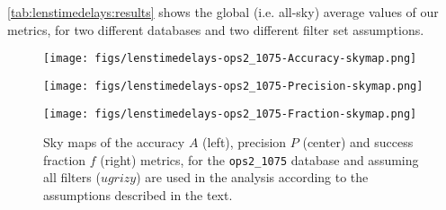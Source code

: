 \autoref{tab:lenstimedelays:results} shows the global (i.e. all-sky)
average values of our metrics, for two different \OpSim
databases and two different filter set assumptions.



\begin{figure*}[!ht]
  \capstart
  \begin{minipage}[b]{\linewidth}
    \begin{minipage}[b]{0.32\linewidth}
      \centering\texttt{[image: figs/lenstimedelays-ops2\_1075-Accuracy-skymap.png]}
    \end{minipage} \hfill
    \begin{minipage}[b]{0.32\linewidth}
      \centering\texttt{[image: figs/lenstimedelays-ops2\_1075-Precision-skymap.png]}
    \end{minipage} \hfill
    \begin{minipage}[b]{0.32\linewidth}
      \centering\texttt{[image: figs/lenstimedelays-ops2\_1075-Fraction-skymap.png]}
    \end{minipage}
  \end{minipage}
\caption{Sky maps of the accuracy $A$ (left), precision $P$ (center) and
success fraction $f$ (right) metrics, for the \texttt{ops2\_1075} \OpSim
database and assuming all filters ($ugrizy$) are used in the analysis
according to the assumptions described in the text.}
\label{fig:lenstimedelays:results}
\end{figure*}


